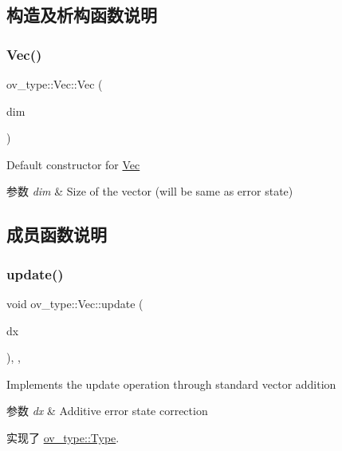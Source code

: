 \subsection{构造及析构函数说明}
\mbox{\label{classov__type_1_1Vec_aae80ad8a2e9580f20ee90e126f36bcb0}} 
\subsubsection{\texorpdfstring{Vec()}{Vec()}}
{\footnotesize\ttfamily ov\+\_\+type\+::\+Vec\+::\+Vec (\begin{DoxyParamCaption}\item[{int}]{dim }\end{DoxyParamCaption})\hspace{0.3cm}{\ttfamily [inline]}}



Default constructor for \hyperlink{classov__type_1_1Vec}{Vec} 


\begin{DoxyParams}{参数}
{\em dim} & Size of the vector (will be same as error state) \\
\hline
\end{DoxyParams}


\subsection{成员函数说明}
\mbox{\label{classov__type_1_1Vec_a7d66e9414946807c9469de0a1038256d}} 
\subsubsection{\texorpdfstring{update()}{update()}}
{\footnotesize\ttfamily void ov\+\_\+type\+::\+Vec\+::update (\begin{DoxyParamCaption}\item[{const Eigen\+::\+Vector\+Xd \&}]{dx }\end{DoxyParamCaption})\hspace{0.3cm}{\ttfamily [inline]}, {\ttfamily [override]}, {\ttfamily [virtual]}}



Implements the update operation through standard vector addition 


\begin{DoxyParams}{参数}
{\em dx} & Additive error state correction \\
\hline
\end{DoxyParams}


实现了 \hyperlink{classov__type_1_1Type_a4e133d50af35f07bd97f73590fe31000}{ov\+\_\+type\+::\+Type}.

